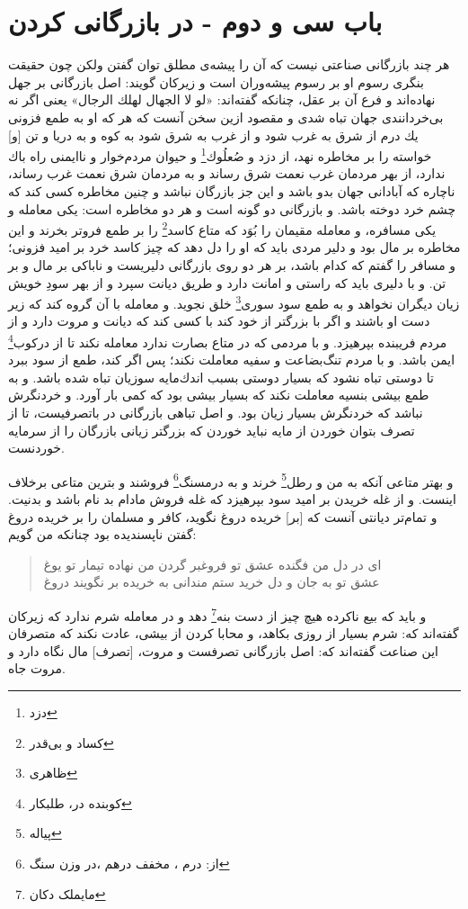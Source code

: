 \section*{باب سى و دوم
 - در بازرگانى كردن}

هر چند بازرگانى صناعتى نيست كه آن را پيشه‌ی مطلق توان گفتن ولكن چون حقيقت بنگرى رسوم او بر رسوم پيشه‌وران‌ است و زيركان گويند: اصل بازرگانى بر جهل نهاده‌اند و فرع آن بر عقل، چنانكه گفته‌اند: «لو لا الجهال لهلك الرجال» يعنى اگر نه بى‌خردانندى جهان تباه شدى و مقصود ازين سخن آنست كه هر كه او به طمع فزونى يك درم از شرق به غرب شود و از غرب به شرق شود به كوه و به دريا و تن [و] خواسته را بر مخاطره نهد، از دزد و صُعلُوك\footnote{دزد}  و حيوان مردم‌خوار و ناايمنى راه باك ندارد، از بهر مردمان غرب نعمت شرق رساند و به مردمان شرق نعمت غرب رساند، ناچاره كه آبادانى جهان بدو باشد و اين جز بازرگان نباشد و چنين مخاطره كسى كند كه چشم خرد دوخته باشد. و بازرگانى دو گونه است و هر دو مخاطره است: يكى معامله و يكى مسافره، و معامله مقيمان را بُوَد كه متاع كاسد\footnote{کساد و بی‌قدر}  را بر طمع فروتر بخرند و اين مخاطره بر مال بود و دلير مردى بايد كه او را دل دهد كه چيز كاسد خرد بر اميد فزونى؛ و مسافر را گفتم كه كدام باشد، بر هر دو روى بازرگانى دليريست و ناباكى بر مال و بر تن. و با دليرى بايد كه راستى و امانت دارد و طريق ديانت سپرد و از بهر سودِ خويش زيان ديگران نخواهد و به طمع سود سورى\footnote{ظاهری}  خلق نجويد. و معامله با آن گروه كند كه زير دست او باشند و اگر با بزرگتر از خود كند با كسى كند كه ديانت و مروت دارد و از مردم فريبنده بپرهيزد. و با مردمى كه در متاع بصارت ندارد معامله نكند تا از دركوب\footnote{کوبنده در، طلبکار}  ايمن باشد. و با مردم تنگ‌بضاعت و سفيه معاملت نكند؛ پس اگر كند، طمع از سود ببرد تا دوستى تباه نشود كه بسيار دوستى بسبب اندك‌مايه سوزيان تباه شده باشد. و به طمع بيشى بنسيه معاملت نكند كه بسيار بيشى بود كه كمى بار آورد. و خرد‌نگرش نباشد كه خرد‌نگرش بسيار زيان بود. و اصل تباهى بازرگانى در باتصرفيست، تا از تصرف بتوان خوردن از مايه نبايد خوردن كه بزرگتر زيانى بازرگان را از سرمايه خوردنست.

و بهتر متاعى آنكه به من و رطل\footnote{پیاله}  خرند و به درمسنگ\footnote{از: درم ، مخفف درهم ،در وزن سنگ} فروشند و بترين متاعى برخلاف اينست. و از غله خريدن بر اميد سود بپرهيزد كه غله فروش مادام بد نام باشد و بدنيت. و تمام‌تر ديانتى آنست كه [بر] خريده دروغ نگويد، كافر و مسلمان را بر خريده دروغ گفتن ناپسنديده بود چنانكه من گويم: 
\begin{quote}
اى در دل من فگنده عشق تو فروغ\quad \quad بر گردن من نهاده تيمار تو يوغ\\
عشق تو به جان و دل خريد ستم من\quad \quad دانى به خريده بر نگويند دروغ
\end{quote}
و بايد كه بيع ناكرده هيچ چيز از دست بنه\footnote{مایملک دکان} دهد و در معامله شرم ندارد كه زيركان گفته‌اند كه: شرم بسيار از روزى بكاهد، و محابا كردن از بيشى، عادت نكند كه متصرفان اين صناعت گفته‌اند كه: اصل بازرگانى تصرفست و مروت، [تصرف] مال نگاه دارد و مروت جاه.

